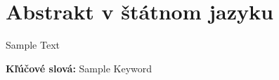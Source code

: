 \thispagestyle{empty}
\section*{Abstrakt v štátnom jazyku}
Sample Text
\begin{flushleft}
  \textbf{Kľúčové slová:} Sample Keyword
\end{flushleft}
